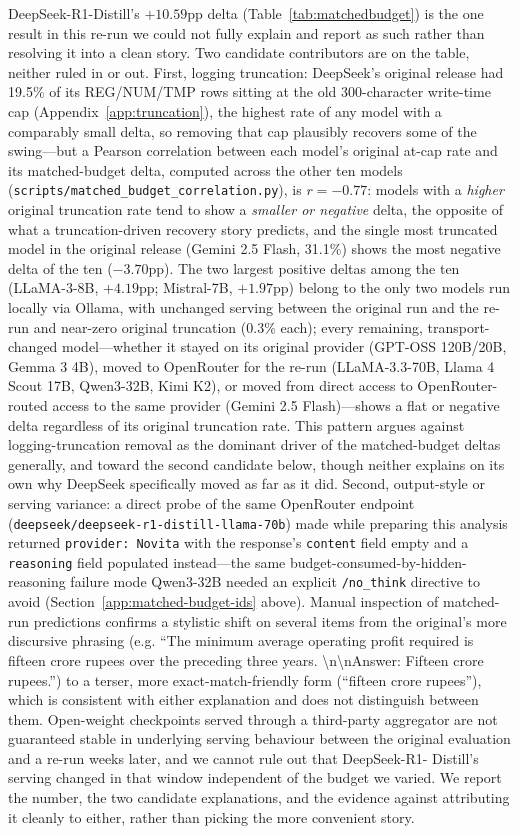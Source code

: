 DeepSeek-R1-Distill's $+10.59$pp delta (Table~\ref{tab:matchedbudget}) is the one result in this
re-run we could not fully explain and report as such rather than resolving it into a clean story. Two
candidate contributors are on the table, neither ruled in or out. First, logging truncation:
DeepSeek's original release had 19.5\% of its REG/NUM/TMP rows sitting at the old 300-character
write-time cap (Appendix~\ref{app:truncation}), the highest rate of any model with a comparably small
delta, so removing that cap plausibly recovers some of the swing---but a Pearson correlation between
each model's original at-cap rate and its matched-budget delta, computed across the other ten
models (\texttt{scripts/matched\_budget\_correlation.py}), is $r = -0.77$: models with a
\emph{higher} original truncation rate tend to show a \emph{smaller or negative} delta, the opposite
of what a truncation-driven recovery story predicts, and the single most truncated model in the
original release (Gemini 2.5 Flash, 31.1\%) shows the most negative delta of the ten ($-3.70$pp).
The two largest positive deltas among the ten (LLaMA-3-8B, $+4.19$pp; Mistral-7B, $+1.97$pp) belong
to the only two models run locally via Ollama, with unchanged serving between the original run and
the re-run and near-zero original truncation (0.3\% each); every remaining, transport-changed
model---whether it stayed on its original provider (GPT-OSS 120B/20B, Gemma 3 4B), moved to
OpenRouter for the re-run (LLaMA-3.3-70B, Llama 4 Scout 17B, Qwen3-32B, Kimi K2), or moved from
direct access to OpenRouter-routed access to the same provider (Gemini 2.5 Flash)---shows a flat or
negative delta regardless of its original truncation rate. This pattern argues against
logging-truncation removal as the dominant driver of the matched-budget deltas generally, and toward
the second candidate below, though neither explains on its own why DeepSeek specifically moved as
far as it did. Second, output-style or serving variance: a direct probe of the same OpenRouter
endpoint (\texttt{deepseek/deepseek-r1-distill-llama-70b}) made while preparing this analysis
returned \texttt{provider: Novita} with the response's \texttt{content} field empty and a
\texttt{reasoning} field populated instead---the same budget-consumed-by-hidden-reasoning failure
mode Qwen3-32B needed an explicit \texttt{/no\_think} directive to avoid (Section~\ref{app:matched-budget-ids}
above). Manual inspection of matched-run predictions confirms a stylistic shift on several items from
the original's more discursive phrasing (e.g. ``The minimum average operating profit required is
fifteen crore rupees over the preceding three years. \textbackslash n\textbackslash nAnswer: Fifteen
crore rupees.'') to a terser, more exact-match-friendly form (``fifteen crore rupees''), which is
consistent with either explanation and does not distinguish between them. Open-weight checkpoints
served through a third-party aggregator are not guaranteed stable in underlying serving behaviour
between the original evaluation and a re-run weeks later, and we cannot rule out that DeepSeek-R1-
Distill's serving changed in that window independent of the budget we varied. We report the number,
the two candidate explanations, and the evidence against attributing it cleanly to either, rather than
picking the more convenient story.

